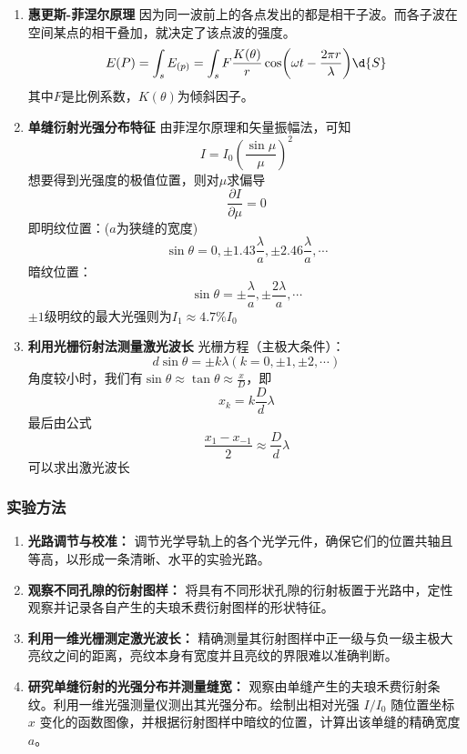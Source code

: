 \documentclass[10pt,a4paper]{ctexart}
\newcommand{\myspace}[1]{\par\vspace{#1\baselineskip}} %
\begin{document}
  \begin{enumerate}
    \item \textbf{惠更斯-菲涅尔原理}
    因为同一波前上的各点发出的都是相干子波。而各子波在空间某点的相干叠加，就决定了该点波的强度。
\[
E(P) = \int_s {E_{(p)}} = \int_s F\frac{K(\theta)}{r}\cos(\omega t - \frac{2 \pi r}{\lambda})\d{S}
\]
其中$F$是比例系数，$K(\theta)$为倾斜因子。

    \item \textbf{单缝衍射光强分布特征}
    由菲涅尔原理和矢量振幅法，可知\[
I = I_0 (\frac{\sin \mu}{\mu})^2
\]
想要得到光强度的极值位置，则对$\mu$求偏导
\[
\frac{\partial I}{\partial \mu} = 0
\]
即明纹位置：($a$为狭缝的宽度)
\[
\sin\theta = 0, \pm 1.43\frac{\lambda}{a}, \pm 2.46\frac{\lambda}{a}, \cdots
\]
暗纹位置：
\[
\sin\theta = \pm \frac{\lambda}{a}, \pm \frac{2\lambda}{a}, \cdots
\]
$\pm 1$级明纹的最大光强则为$I_1 \approx 4.7\% I_0$

    \item \textbf{利用光栅衍射法测量激光波长}
    光栅方程（主极大条件）：
\[
d\sin \theta = \pm k\lambda(k = 0, \pm 1, \pm 2, \cdots)
\]
角度较小时，我们有$\sin\theta \approx \tan \theta \approx \frac{x}{D}$，即
\[
x_k = k\frac{D}{d}\lambda
\]
最后由公式\[\frac{x_1 - x_{-1}}{2} \approx \frac{D}{d}\lambda\]
可以求出激光波长

\end{enumerate}

\subsubsection{实验方法}
\begin{enumerate}
    \item \textbf{光路调节与校准：}
    调节光学导轨上的各个光学元件，确保它们的位置共轴且等高，以形成一条清晰、水平的实验光路。

    \item \textbf{观察不同孔隙的衍射图样：}
    将具有不同形状孔隙的衍射板置于光路中，定性观察并记录各自产生的夫琅禾费衍射图样的形状特征。

    \item \textbf{利用一维光栅测定激光波长：}
    精确测量其衍射图样中正一级与负一级主极大亮纹之间的距离，亮纹本身有宽度并且亮纹的界限难以准确判断。

    \item \textbf{研究单缝衍射的光强分布并测量缝宽：}
    观察由单缝产生的夫琅禾费衍射条纹。利用一维光强测量仪测出其光强分布。绘制出相对光强 $I/I_0$ 随位置坐标 $x$ 变化的函数图像，并根据衍射图样中暗纹的位置，计算出该单缝的精确宽度 $a$。

\end{enumerate}
    \myspace{2}
    
\end{document}
